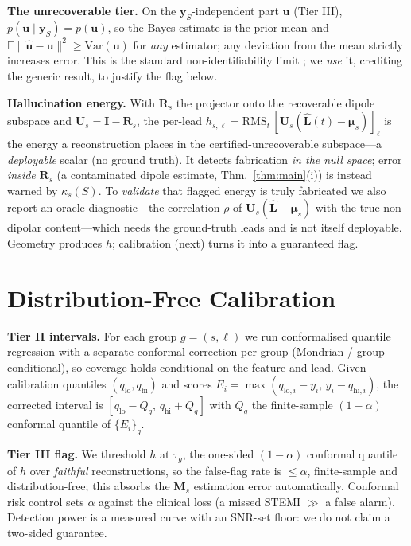\documentclass{article}
\begin{document}
\textbf{The unrecoverable tier.} On the $\bm y_S$-independent part $\bm u$ (Tier III),
$p(\bm u\mid\bm y_S)=p(\bm u)$, so the Bayes estimate is the prior mean and
$\mathbb E\|\widehat{\bm u}-\bm u\|^2\ge\mathrm{Var}(\bm u)$ for \emph{any} estimator;
any deviation from the mean strictly increases error. This is the standard
non-identifiability limit \cite{gottschling2026hallucinations,kim2025distshift}; we
\emph{use} it, crediting the generic result, to justify the flag below.

\textbf{Hallucination energy.} With $\bm R_s$ the projector onto the recoverable
dipole subspace and $\bm U_s=\bm I-\bm R_s$, the per-lead
$h_{s,\ell}=\mathrm{RMS}_t\,[\bm U_s(\widehat{\bm L}(t)-\bm\mu_s)]_\ell$ is the energy a
reconstruction places in the certified-unrecoverable subspace---a \emph{deployable}
scalar (no ground truth). It detects fabrication \emph{in the null space}; error
\emph{inside} $\bm R_s$ (a contaminated dipole estimate, Thm.~\ref{thm:main}(i)) is
instead warned by $\kappa_s(S)$. To \emph{validate} that flagged energy is truly
fabricated we also report an oracle diagnostic---the correlation $\rho$ of
$\bm U_s(\widehat{\bm L}-\bm\mu_s)$ with the true non-dipolar content---which needs the
ground-truth leads and is not itself deployable. Geometry produces $h$; calibration
(next) turns it into a guaranteed flag.

\section{Distribution-Free Calibration}
\label{sec:calib}

\textbf{Tier II intervals.} For each group $g=(s,\ell)$ we run conformalised quantile
regression \cite{romano2019cqr} with a separate conformal correction per group
(Mondrian / group-conditional), so coverage holds conditional on the feature and
lead. Given calibration quantiles $(q_{\mathrm{lo}},q_{\mathrm{hi}})$ and scores
$E_i=\max(q_{\mathrm{lo},i}-y_i,\,y_i-q_{\mathrm{hi},i})$, the corrected interval is
$[q_{\mathrm{lo}}-Q_g,\,q_{\mathrm{hi}}+Q_g]$ with $Q_g$ the finite-sample
$(1-\alpha)$ conformal quantile of $\{E_i\}_{g}$.

\textbf{Tier III flag.} We threshold $h$ at $\tau_g$, the one-sided $(1-\alpha)$
conformal quantile of $h$ over \emph{faithful} reconstructions, so the false-flag rate
is $\le\alpha$, finite-sample and distribution-free; this absorbs the $\bm M_s$
estimation error automatically. Conformal risk control \cite{angelopoulos2024crc} sets
$\alpha$ against the clinical loss (a missed STEMI $\gg$ a false alarm). Detection
power is a measured curve with an SNR-set floor: we do not claim a two-sided guarantee.
\end{document}
